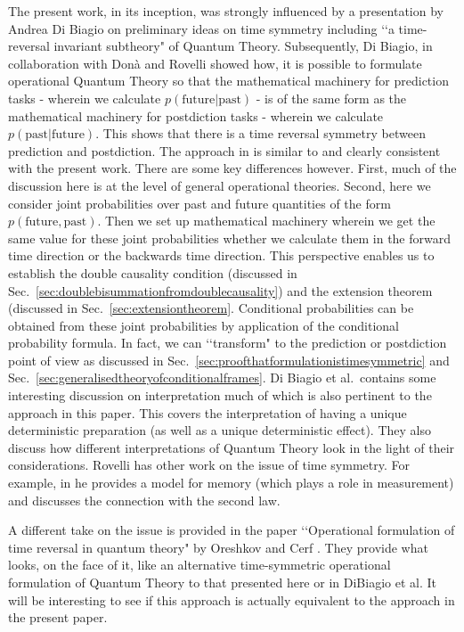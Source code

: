 \documentclass[10pt]{article}
\begin{document}
The present work, in its inception, was strongly influenced by a presentation by Andrea Di Biagio  on preliminary ideas on time symmetry including \lq\lq a time-reversal invariant subtheory" of Quantum Theory.  Subsequently,  Di Biagio, in collaboration with Don\`a and Rovelli \cite{di2020quantum} showed how, it is possible to formulate operational Quantum Theory so that the mathematical machinery for prediction tasks - wherein we calculate $p(\text{future}|\text{past})$ - is of the same form as the mathematical machinery for postdiction tasks - wherein we calculate $p(\text{past}|\text{future})$.  This shows that there is a time reversal symmetry between prediction and postdiction.  The approach in \cite{di2020quantum} is similar to and clearly consistent with the present work.  There are some key differences however.   First, much of the discussion here is at the level of general operational theories.  Second, here we consider joint probabilities over past and future quantities of the form $p(\text{future},\text{past})$.   Then we set up mathematical machinery wherein we get the same value for these joint probabilities whether we calculate them in the forward time direction or the backwards time direction.  This perspective enables us to establish the double causality condition (discussed in Sec.\ \ref{sec:doublebisummationfromdoublecausality}) and the extension theorem (discussed in Sec.\ \ref{sec:extensiontheorem}.  Conditional probabilities can be obtained from these joint probabilities by application of the conditional probability formula.  In fact, we can \lq\lq transform" to the prediction or postdiction point of view as discussed in Sec.\ \ref{sec:proofthatformulationistimesymmetric} and Sec.\ \ref{sec:generalisedtheoryofconditionalframes}. Di Biagio et al.\ contains some interesting discussion on interpretation much of which is also pertinent to the approach in this paper. This covers the interpretation of having a unique deterministic  preparation (as well as a unique deterministic effect). They also discuss how different interpretations of Quantum Theory look in the light of their considerations.  Rovelli has other work on the issue of time symmetry.  For example, in  \cite{rovelli2020memory} he provides a model for memory (which plays a role in measurement) and discusses the connection with the second law.

A different take on the issue is provided in the paper \lq\lq Operational formulation of time reversal in quantum theory" by Oreshkov and Cerf \cite{oreshkov2016operational}.  They provide what looks, on the face of it, like an alternative time-symmetric operational formulation of Quantum Theory to that presented here or in DiBiagio et al.  It will be interesting to see if this approach is actually equivalent to the approach in the present paper.
\end{document}
